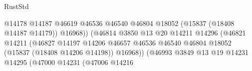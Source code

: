 \begin{lexlean}{RustStd}
\begin{coremodule}
                                                              @14178
                                                              @14187
                                                              @46619
                                                              @46536
                                                              @46540
                                                              @46804
                                                              @18052
                                                              (@15837 (@18408 @14187 @14179))
                                                              @16968))
                                                          (@46814
                                                            @3850
                                                            @13
                                                            @20
                                                            @14211
                                                            @14296
                                                            (@46821
                                                              @14211
                                                              (@46827
                                                                @14197
                                                                @14206
                                                                @46657
                                                                @46536
                                                                @46540
                                                                @46804
                                                                @18052
                                                                (@15837 (@18408 @14206 @14198))
                                                                @16968))
                                                            (@46993
                                                              @3849
                                                              @13
                                                              @19
                                                              @14231
                                                              @14295
                                                              (@47000
                                                                @14231
                                                                (@47006
                                                                  @14216

\end{coremodule}
\end{lexlean}
